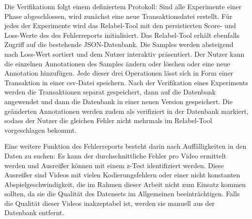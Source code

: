 Die Verifikationn folgt einem definiertem Protokoll:
Sind alle Experimente einer Phase abgeschlossen, wird zunächst eine neue Transaktionsdatei erstellt.
Für jedes der Experimente wird das Relabel-Tool mit den persistierten Score- und Loss-Werte des des Fehlerreports initialisiert.
Das Relabel-Tool erhält ebenfalls Zugriff auf die bestehende JSON-Datenbank.
Die Samples werden absteigend nach Loss-Wert sortiert und dem Nutzer interaktiv präsentiert.
Der Nutzer kann die einzelnen Annotationen des Samples ändern oder löschen oder eine neue Annotation hinzufügen.
Jede dieser drei Operationen lässt sich in Form einer Transaktion in einer \gls{csv}-Datei speichern.
Nach der Verifikation eines Experiments werden die Transaktionen separat gespeichert, dann auf die Datenbank angewendet und dann die Datenbank in einer neuen Version gespeichert.
Die geänderten Annotationen werden zudem als verifiziert in der Datenbank markiert, sodass der Nutzer die gleichen Fehler nicht mehrmals im Relabel-Tool vorgeschlagen bekommt.

Eine weitere Funktion des Fehlerreports besteht darin nach Auffälligkeiten in den Daten zu suchen:
Es kann der durchschnittliche Fehler pro Video ermittelt werden und Ausreißer können mit einem z-Test identifiziert werden.
Diese Ausreißer sind \zB Videos mit vielen Kodierungsfehlern oder einer nicht konstanten Abspielgeschwindigkeit, die im Rahmen dieser Arbeit nicht zum Einsatz kommen sollten, da sie die Qualität des Datensets im Allgemeinen beeinträchtigen.
Falls die Qualität dieser Videos inakzeptabel ist, werden sie manuell aus der Datenbank entfernt.

